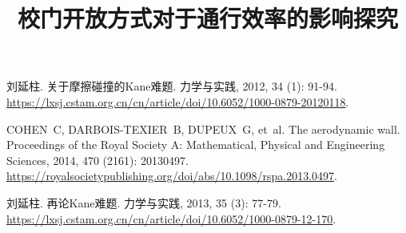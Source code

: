 \documentclass[withoutpreface,bwprint]{cumcmthesis} %
\title{校门开放方式对于通行效率的影响探究}
\begin{document}
\maketitle





\begin{thebibliography}{9}%
刘延柱.
\newblock 关于摩擦碰撞的Kane难题\allowbreak[J/OL].
\newblock 力学与实践, 2012, 34 (1): 91-94.
\newblock \url{https://lxsj.cstam.org.cn/cn/article/doi/10.6052/1000-0879-20120118}.

COHEN~C, DARBOIS-TEXIER~B, DUPEUX~G, et~al.
\newblock The aerodynamic wall\allowbreak[J/OL].
\newblock Proceedings of the Royal Society A: Mathematical, Physical and Engineering Sciences, 2014, 470 (2161): 20130497.
\newblock \url{https://royalsocietypublishing.org/doi/abs/10.1098/rspa.2013.0497}.

刘延柱.
\newblock 再论Kane难题\allowbreak[J/OL].
\newblock 力学与实践, 2013, 35 (3): 77-79.
\newblock \url{https://lxsj.cstam.org.cn/cn/article/doi/10.6052/1000-0879-12-170}.
\end{thebibliography}
\end{document}
